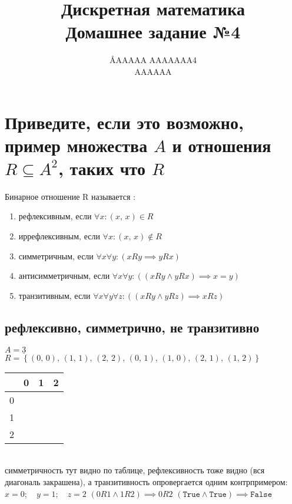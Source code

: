 \documentclass{article}
\title{Дискретная математика \\ Домашнее задание №4}
\author{\AA{AAAAA AAAAAAA}{4} \\ AAAAAA}
\newcommand{\ds}{\displaystyle}
\newcommand{\range}{\underline}
\newcommand{\pe}[2]{({#1},\, {#2})}
\newcommand{\p}[2]{\pe{#1}{#2},\,}
\newcommand{\K}{\cellcolor{black}}
\renewcommand{\l}{\left}
\renewcommand{\r}{\right}
\begin{document}
  \maketitle

  \section{Приведите, если это возможно, пример множества $A$ и отношения $R \subseteq A^2$, таких что $R$}
  Бинарное отношение R называется \cite{dashkov}:
  \begin{enumerate}
    \item рефлексивным, если $\forall x: (x,\, x) \in R$
    \item иррефлексивным, если $\forall x: (x,\, x) \not\in R$
    \item симметричным, если $\forall x\forall y: (xRy \implies yRx)$
    \item антисимметричным, если $\forall x\forall y: ((xRy \land yRx) \implies x=y)$
    \item транзитивным, если $\forall x\forall y\forall z: ((xRy \land yRz) \implies xRz)$
  \end{enumerate}
  \subsection{рефлексивно, симметрично, не транзитивно}
  $\ds A = \range{3}$ \\
  $\ds R = \l\{\p{0}{0} \p{1}{1} \p{2}{2} \p{0}{1} \p{1}{0} \p{2}{1} \pe{1}{2} \r\}$ \\
  \setlength\tabcolsep{4pt}
  \begin{tabular}{|c|c|c|c|}
    \hline
      & 0 & 1 & 2 \\ \hline
    0 &\K &\K &   \\ \hline
    1 &\K &\K &\K \\ \hline
    2 &   &\K &\K \\ \hline
  \end{tabular}
  \setlength\tabcolsep{6pt} \\
  симметричность тут видно по таблице, рефлексивность тоже видно (вся диагональ закрашена), а транзитивность опровергается одним контрпримером: \\
  $\ds x = 0;\quad y = 1;\quad z = 2$ \hfill
  $\ds (0R1 \land 1R2) \implies 0R2$ \hfill
  $\ds (\texttt{True} \land \texttt{True}) \implies \texttt{False}$
\end{document}
